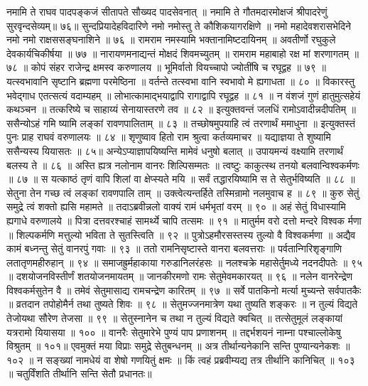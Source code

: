 नमामि ते राघव पादपङ्कजं सीतापते सौख्यद पादसेवनात् ॥
नमामि ते गौतमदारमोक्षजं श्रीपादरेणुं सुरवृन्दसेव्यम्॥ ७६॥
सुन्दप्रियादेहविदारिणे नमो नमोस्तु ते कौशिकयागरक्षिणे ॥
नमो महादेवशरासभेदिने नमो नमो राक्षससङ्घनाशिने ॥ ७६ ॥
रामराम नमस्यामि भक्तानामिष्टदायिनम् ॥
अवतीर्णो रघुकुले देवकार्यचिकीर्षया ॥ ७७ ॥
नारायणमनाद्यन्तं मोक्षदं शिवमच्युतम् ॥
रामराम महाबाहो रक्ष मां शरणागतम् ॥ ७८ ॥
कोपं संहर राजेन्द्र क्षमस्व करुणालय ॥
भूमिर्वातो वियच्चापो ज्योतींषि च रघूद्वह ॥ ७९ ॥
यत्स्वभावानि सृष्टानि ब्रह्मणा परमेष्ठिना ॥
वर्तन्ते तत्स्वभा वानि स्वभावो मे ह्यगाधता ॥ ८० ॥
विकारस्तु भवेद्गाध एतत्सत्यं वदाम्यहम् ॥
लोभात्कामाद्भयाद्वापि रागाद्वापि रघूद्वह ॥ ८१ ॥
न वंशजं गुणं हातुमुत्सहेयं कथञ्चन ॥
तत्करिष्ये च साहाय्यं सेनायास्तरणे तव ॥ ८२ ॥
इत्युक्तवन्तं जलधिं रामोऽवादीन्नदीपतिम् ॥
ससैन्योऽहं गमि ष्यामि लङ्कां रावणपालिताम् ॥ ८३ ॥
तच्छोषमुपयाहि त्वं तरणार्थं ममाधुना ॥
इत्युक्तस्तं पुनः प्राह राघवं वरुणालयः ॥ ८४ ॥
शृणुष्वाव हितो राम श्रुत्वा कर्तव्यमाचर ॥
यद्याज्ञया ते शुष्यामि ससैन्यस्य यियासतः ॥ ८५॥
अन्येऽप्याज्ञापयिष्यन्ति मामेवं धनुषो बलात् ॥
उपायमन्यं वक्ष्यामि तरणार्थं बलस्य ते ॥ ८६ ॥
अस्ति ह्यत्र नलोनाम वानरः शिल्पिसम्मतः ॥
त्वष्टुः काकुत्स्थ तनयो बलवान्विश्वकर्मणः ॥ ८७ ॥
स यत्काष्ठं तृणं वापि शिलां वा क्षेप्स्यते मयि ॥
सर्वं तद्धारयिष्यामि स ते सेतुर्भविष्यति ॥ ८८ ॥
सेतुना तेन गच्छ त्वं लङ्कां रावणपालि ताम् ॥
उक्त्वेत्यन्तर्हिते तस्मिन्रामो नलमुवाच ह ॥ ८९ ॥
कुरु सेतुं समुद्रे त्वं शक्तो ह्यसि महामते ॥
तदाऽब्रवीन्नलो वाक्यं रामं धर्मभृतां वरम् ॥ ९० ॥
अहं सेतुं विधास्यामि ह्यगाधे वरुणालये ॥
पित्रा दत्तवरश्चाहं सामर्थ्ये चापि तत्समः ॥ ९१ ॥
मातुर्मम वरो दत्तो मन्दरे विश्वक र्मणा ॥
शिल्पकर्मणि मत्तुल्यो भविता ते सुतस्त्विति ॥ ९२ ॥
पुत्रोऽहमौरसस्तस्य तुल्यो वै विश्वकर्मणा ॥
अद्यैव कामं बध्नन्तु सेतुं वानरपुं गवाः ॥ ९३ ॥
ततो रामनिसृष्टास्ते वानरा बलवत्तराः ॥
पर्वतान्गिरिशृङ्गाणि लतातृणमहीरुहान् ॥ ९४ ॥
समाजह्रुर्महाकाया गरुडानिलरंहसः ॥
नलश्चक्रे महासेर्तुमध्ये नदनदीपतेः ॥ ९५ ॥
दशयोजनविस्तीर्णं शतयोजनमायतम् ॥
जानकीरमणो रामः सेतुमेवमकारयत् ॥ ९६ ॥
नलेन वानरेन्द्रेण विश्वकर्मसुतेन वै ॥
तमेवं सेतुमासाद्य रामचन्द्रेण कारितम् ॥ ९७ ॥
सर्वे पातकिनो मर्त्या मुच्यन्ते सर्वपातकैः ॥
व्रतदान तपोहोमैर्न तथा तुष्यते शिवः ॥ ९८ ॥
सेतुमज्जनमात्रेण यथा तुष्यति शङ्करः ॥
न तुल्यं विद्यते तेजोयथा सौरेण तेजसा ॥ ९९ ॥
सेतुस्नानेन च तथा न तुल्यं विद्यते क्वचित् ॥
तत्सेतुमूलं लङ्कायां यत्ररामो यियासया ॥ १०० ॥
वानरैः सेतुमारेभे पुण्यं पाप प्रणाशनम् ॥
तद्दर्भशयनं नाम्ना पश्चाल्लोकेषु विश्रुतम् ॥ १०१॥
एवमुक्तं मया विप्राः समुद्रे सेतुबन्धनम् ॥
अत्र तीर्थान्यनेकानि सन्ति पुण्यान्यनेकशः ॥ १०२ ॥
न सङ्ख्यां नामधेयं वा शेषो गणयितुं क्षमः ॥
किं त्वहं प्रब्रवीम्यद्य तत्र तीर्थानि कानिचित् ॥ १०३ ॥
चतुर्विंशति तीर्थानि सन्ति सेतौ प्रधानतः॥
